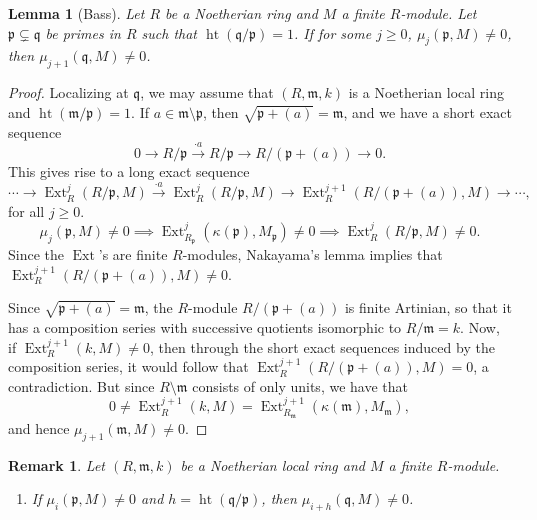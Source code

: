 \documentclass[10pt]{article}
\theoremstyle{thmstyle}
\newtheorem{lemma}[theorem]{Lemma}
\theoremstyle{defstyle}
\newtheorem{remark}[theorem]{Remark}
\newcommand{\frakm}{\mathfrak{m}} %
\newcommand{\frakp}{\mathfrak{p}} %
\newcommand{\frakq}{\mathfrak{q}} %
\renewcommand{\ge}{\geqslant}
\newcommand{\Ext}{\operatorname{Ext}}
\newcommand{\hght}{\operatorname{ht}}
\begin{document}
\begin{lemma}[Bass]
    Let $R$ be a Noetherian ring and $M$ a finite $R$-module. Let $\frakp\subsetneq\frakq$ be primes in $R$ such that $\hght(\frakq/\frakp) = 1$. If for some $j\ge 0$, $\mu_j(\frakp, M)\ne 0$, then $\mu_{j + 1}(\frakq, M)\ne 0$.
\end{lemma}
\begin{proof}
    Localizing at $\frakq$, we may assume that $(R,\frakm, k)$ is a Noetherian local ring and $\hght(\frakm/\frakp) = 1$. If $a\in\frakm\setminus\frakp$, then $\sqrt{\frakp + (a)} = \frakm$, and we have a short exact sequence 
    \begin{equation*}
        0\to R/\frakp\xrightarrow{\cdot a} R/\frakp\to R/(\frakp + (a)) \to 0.
    \end{equation*}
    This gives rise to a long exact sequence 
    \begin{equation*}
        \cdots\to \Ext^j_R(R/\frakp, M)\xrightarrow{\cdot a}\Ext^j_R(R/\frakp, M)\to\Ext^{j + 1}_R(R/(\frakp + (a)), M)\to\cdots,
    \end{equation*}
    for all $j\ge 0$.
    \begin{equation*}
        \mu_j(\frakp, M)\ne 0\implies\Ext^j_{R_\frakp}\left(\kappa(\frakp), M_\frakp\right)\ne 0\implies \Ext^j_R(R/\frakp, M)\ne 0.
    \end{equation*}
    Since the $\Ext$'s are finite $R$-modules, Nakayama's lemma implies that $\Ext^{j + 1}_R(R/(\frakp + (a)), M)\ne 0$. 
    
    Since $\sqrt{\frakp + (a)} = \frakm$, the $R$-module $R/(\frakp + (a))$ is finite Artinian, so that it has a composition series with successive quotients isomorphic to $R/\frakm = k$. Now, if $\Ext^{j + 1}_R(k, M)\ne 0$, then through the short exact sequences induced by the composition series, it would follow that $\Ext^{j + 1}_R(R/(\frakp + (a)), M) = 0$, a contradiction. But since $R\setminus\frakm$ consists of only units, we have that 
    \begin{equation*}
        0\ne\Ext^{j + 1}_R(k, M) = \Ext^{j + 1}_{R_\frakm}(\kappa(\frakm), M_\frakm),
    \end{equation*}
    and hence $\mu_{j + 1}(\frakm, M)\ne 0$.
\end{proof}

\begin{remark}
Let $(R,\frakm, k)$ be a Noetherian local ring and $M$ a finite $R$-module.
\begin{enumerate}[label=(\roman*)]
    \item If $\mu_i(\frakp, M)\ne 0$ and $h = \hght(\frakq/\frakp)$, then $\mu_{i + h}(\frakq, M)\ne 0$. 
\end{enumerate}
\end{remark}
\end{document}
